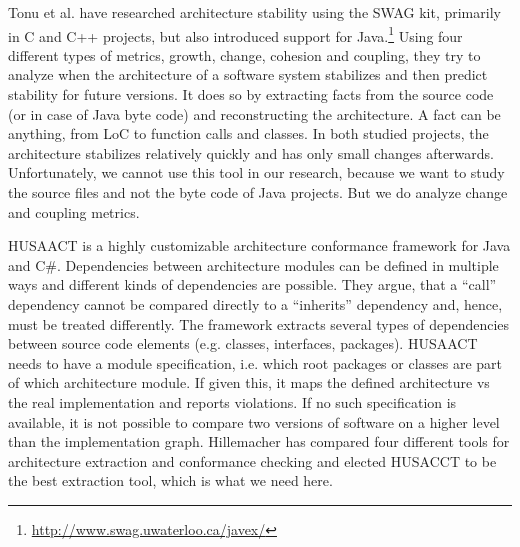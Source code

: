 \documentclass[sigplan, anonymous, review]{acmart}
\begin{document}
Tonu et al. \cite{Swag} have researched architecture stability using the SWAG kit, primarily in C and C++ projects, but also introduced support for Java.\footnote{\url{http://www.swag.uwaterloo.ca/javex/}} Using four different types of metrics, growth, change, cohesion and coupling, they try to analyze when the architecture of a software system stabilizes and then predict stability for future versions. It does so by extracting facts from the source code (or in case of Java byte code) and reconstructing the architecture. A fact can be anything, from LoC to function calls and classes. 
In both studied projects, the architecture stabilizes relatively quickly and has only small changes afterwards. Unfortunately, we cannot use this tool in our research, because we want to study the source files and not the byte code of Java projects. But we do analyze change and coupling metrics.

HUSAACT \cite{Husacct1,Husacct2} is a highly customizable architecture conformance framework for Java and C\#. Dependencies between architecture modules can be defined in multiple ways and different kinds of dependencies are possible. They argue, that a ``call'' dependency cannot be compared directly to a ``inherits'' dependency and, hence, must be treated differently. 
The framework extracts several types of dependencies between source code elements (e.g. classes, interfaces, packages). HUSAACT needs to have a module specification, i.e. which root packages or classes are part of which architecture module. If given this, it maps the defined architecture vs the real implementation and reports violations.
If no such specification is available, it is not possible to compare two versions of software on a higher level than the implementation graph. 
Hillemacher \cite{MScSteffen} has compared four different tools for architecture extraction and conformance checking and elected HUSACCT to be the best extraction tool, which is what we need here.
\end{document}
